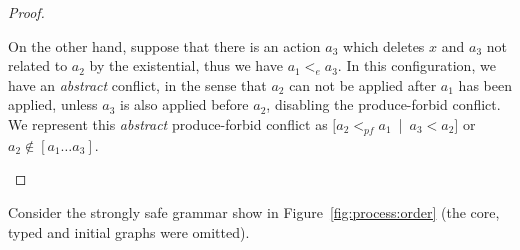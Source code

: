 \begin{proof}
\begin{description}[style=nextline,leftmargin=*]
    On the other hand, suppose that there is an action $a_3$ which deletes $x$ and $a_3$ not related to $a_2$ by the existential, thus we have $a_1 <_e a_3$. In this configuration, we have an \emph{abstract} conflict, in the sense that $a_2$ can not be applied after $a_1$ has been applied, unless $a_3$ is also applied before $a_2$, disabling the produce-forbid conflict. We represent this \emph{abstract} produce-forbid conflict as \mbox{$[a_2 <_{pf} a_1$ | $a_3 < a_2]$} or \mbox{$a_2 \not\in [a_1\ldots a_3]$}.
\end{description}
\end{proof}

\begin{example} Consider the strongly safe grammar show in Figure~\ref{fig:process:order} (the core, typed and initial graphs were omitted). 
  

\end{example}
